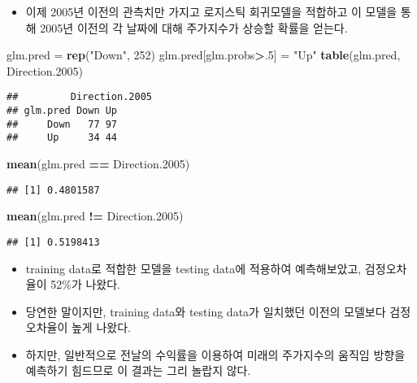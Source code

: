 \documentclass[]{article}
\newenvironment{Shaded}{\begin{snugshade}}{\end{snugshade}}
\newcommand{\KeywordTok}[1]{\textcolor[rgb]{0.13,0.29,0.53}{\textbf{#1}}}
\newcommand{\DecValTok}[1]{\textcolor[rgb]{0.00,0.00,0.81}{#1}}
\newcommand{\StringTok}[1]{\textcolor[rgb]{0.31,0.60,0.02}{#1}}
\newcommand{\OperatorTok}[1]{\textcolor[rgb]{0.81,0.36,0.00}{\textbf{#1}}}
\newcommand{\NormalTok}[1]{#1}
\providecommand{\tightlist}{%
  \setlength{\itemsep}{0pt}\setlength{\parskip}{0pt}}
\begin{document}
\begin{itemize}
\tightlist
\item
  이제 2005년 이전의 관측치만 가지고 로지스틱 회귀모델을 적합하고 이
  모델을 통해 2005년 이전의 각 날짜에 대해 주가지수가 상승할 확률을
  얻는다.
\end{itemize}

\begin{Shaded}
\begin{Highlighting}[]
\NormalTok{glm.pred =}\StringTok{ }\KeywordTok{rep}\NormalTok{(}\StringTok{"Down"}\NormalTok{,  }\DecValTok{252}\NormalTok{)}
\NormalTok{glm.pred[glm.probs}\OperatorTok{>}\NormalTok{.}\DecValTok{5}\NormalTok{] =}\StringTok{ "Up"}
\KeywordTok{table}\NormalTok{(glm.pred, Direction.}\DecValTok{2005}\NormalTok{)}
\end{Highlighting}
\end{Shaded}

\begin{verbatim}
##         Direction.2005
## glm.pred Down Up
##     Down   77 97
##     Up     34 44
\end{verbatim}

\begin{Shaded}
\begin{Highlighting}[]
\KeywordTok{mean}\NormalTok{(glm.pred }\OperatorTok{==}\StringTok{ }\NormalTok{Direction.}\DecValTok{2005}\NormalTok{)}
\end{Highlighting}
\end{Shaded}

\begin{verbatim}
## [1] 0.4801587
\end{verbatim}

\begin{Shaded}
\begin{Highlighting}[]
\KeywordTok{mean}\NormalTok{(glm.pred }\OperatorTok{!=}\StringTok{ }\NormalTok{Direction.}\DecValTok{2005}\NormalTok{)}
\end{Highlighting}
\end{Shaded}

\begin{verbatim}
## [1] 0.5198413
\end{verbatim}

\begin{itemize}
\tightlist
\item
  training data로 적합한 모델을 testing data에 적용하여 예측해보았고,
  검정오차율이 52\%가 나왔다.
\item
  당연한 말이지만, training data와 testing data가 일치했던 이전의
  모델보다 검정오차율이 높게 나왔다.
\item
  하지만, 일반적으로 전날의 수익률을 이용하여 미래의 주가지수의 움직임
  방향을 예측하기 힘드므로 이 결과는 그리 놀랍지 않다.
\end{itemize}
\end{document}
